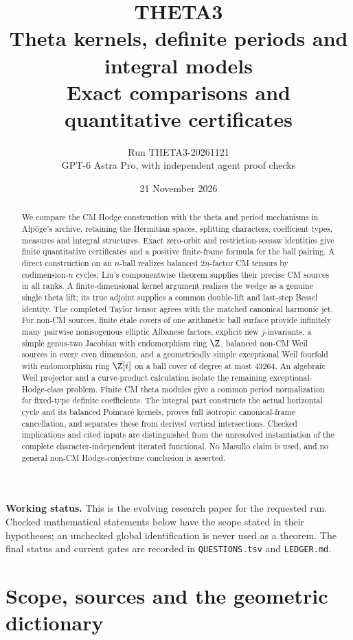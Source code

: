 \documentclass[11pt]{article}
\title{THETA3\\Theta kernels, definite periods and integral models\\\large Exact comparisons and quantitative certificates}
\author{Run THETA3-20261121\\GPT-6 Astra Pro, with independent agent proof checks}
\date{21 November 2026}
\theoremstyle{definition}\newtheorem{definition}[theorem]{Definition}\newtheorem{remark}[theorem]{Remark}
\begin{document}
\maketitle
\begin{abstract}
We compare the CM Hodge construction with the theta and period mechanisms in Alp\"oge's archive, retaining the Hermitian spaces, splitting characters, coefficient types, measures and integral structures. Exact zero-orbit and restriction-seesaw identities give finite quantitative certificates and a positive finite-frame formula for the ball pairing. A direct construction on an $n$-ball realizes balanced $2n$-factor CM tensors by codimension-$n$ cycles; Liu's componentwise theorem supplies their precise CM sources in all ranks. A finite-dimensional kernel argument realizes the wedge as a genuine single theta lift; its true adjoint supplies a common double-lift and last-step Bessel identity. The completed Taylor tensor agrees with the matched canonical harmonic jet. For non-CM sources, finite \'etale covers of one arithmetic ball surface provide infinitely many pairwise nonisogenous elliptic Albanese factors, explicit new $j$-invariants, a simple genus-two Jacobian with endomorphism ring $\Z$, balanced non-CM Weil sources in every even dimension, and a geometrically simple exceptional Weil fourfold with endomorphism ring $\Z[i]$ on a ball cover of degree at most $43264$. An algebraic Weil projector and a curve-product calculation isolate the remaining exceptional-Hodge-class problem. Finite CM theta modules give a common period normalization for fixed-type definite coefficients. The integral part constructs the actual horizontal cycle and its balanced Poincar\'e kernels, proves full isotropic canonical-frame cancellation, and separates these from derived vertical intersections. Checked implications and cited inputs are distinguished from the unresolved instantiation of the complete character-independent iterated functional. No Masullo claim is used, and no general non-CM Hodge-conjecture conclusion is asserted.
\end{abstract}
\noindent\textbf{Working status.} This is the evolving research paper for the requested run. Checked mathematical statements below have the scope stated in their hypotheses; an unchecked global identification is never used as a theorem. The final status and current gates are recorded in \texttt{QUESTIONS.tsv} and \texttt{LEDGER.md}.

\tableofcontents\clearpage
\part{Scope, sources and the geometric dictionary}
\end{document}
